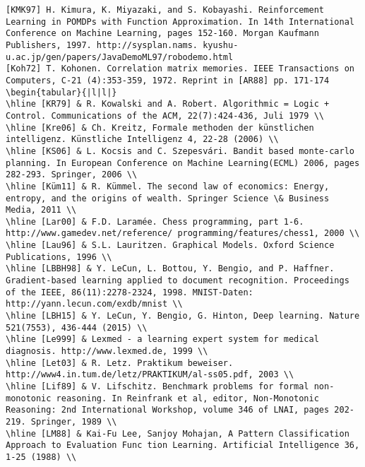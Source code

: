 \documentclass[10pt]{article}
\begin{document}
\begin{verbatim}
[KMK97] H. Kimura, K. Miyazaki, and S. Kobayashi. Reinforcement Learning in POMDPs with Function Approximation. In 14th International Conference on Machine Learning, pages 152-160. Morgan Kaufmann Publishers, 1997. http://sysplan.nams. kyushu-u.ac.jp/gen/papers/JavaDemoML97/robodemo.html
[Koh72] T. Kohonen. Correlation matrix memories. IEEE Transactions on Computers, C-21 (4):353-359, 1972. Reprint in [AR88] pp. 171-174
\begin{tabular}{|l|l|}
\hline [KR79] & R. Kowalski and A. Robert. Algorithmic = Logic + Control. Communications of the ACM, 22(7):424-436, Juli 1979 \\
\hline [Kre06] & Ch. Kreitz, Formale methoden der künstlichen intelligenz. Künstliche Intelligenz 4, 22-28 (2006) \\
\hline [KS06] & L. Kocsis and C. Szepesvári. Bandit based monte-carlo planning. In European Conference on Machine Learning(ECML) 2006, pages 282-293. Springer, 2006 \\
\hline [Küm11] & R. Kümmel. The second law of economics: Energy, entropy, and the origins of wealth. Springer Science \& Business Media, 2011 \\
\hline [Lar00] & F.D. Laramée. Chess programming, part 1-6. http://www.gamedev.net/reference/ programming/features/chess1, 2000 \\
\hline [Lau96] & S.L. Lauritzen. Graphical Models. Oxford Science Publications, 1996 \\
\hline [LBBH98] & Y. LeCun, L. Bottou, Y. Bengio, and P. Haffner. Gradient-based learning applied to document recognition. Proceedings of the IEEE, 86(11):2278-2324, 1998. MNIST-Daten: http://yann.lecun.com/exdb/mnist \\
\hline [LBH15] & Y. LeCun, Y. Bengio, G. Hinton, Deep learning. Nature 521(7553), 436-444 (2015) \\
\hline [Le999] & Lexmed - a learning expert system for medical diagnosis. http://www.lexmed.de, 1999 \\
\hline [Let03] & R. Letz. Praktikum beweiser. http://www4.in.tum.de/letz/PRAKTIKUM/al-ss05.pdf, 2003 \\
\hline [Lif89] & V. Lifschitz. Benchmark problems for formal non-monotonic reasoning. In Reinfrank et al, editor, Non-Monotonic Reasoning: 2nd International Workshop, volume 346 of LNAI, pages 202-219. Springer, 1989 \\
\hline [LM88] & Kai-Fu Lee, Sanjoy Mohajan, A Pattern Classification Approach to Evaluation Func tion Learning. Artificial Intelligence 36, 1-25 (1988) \\

\end{verbatim}
\end{document}
